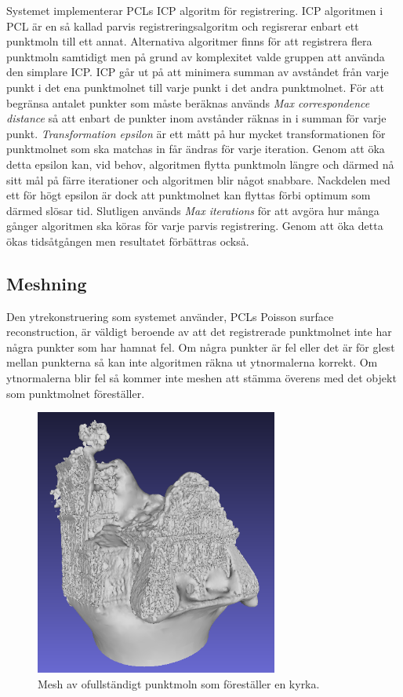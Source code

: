 Systemet implementerar PCLs ICP algoritm för registrering. ICP algoritmen i PCL är en så kallad parvis registreringsalgoritm och regisrerar enbart ett punktmoln till ett annat. Alternativa algoritmer finns för att registrera flera punktmoln samtidigt men på grund av komplexitet valde gruppen att använda den simplare ICP. ICP går ut på att minimera summan av avståndet från varje punkt i det ena punktmolnet till varje punkt i det andra punktmolnet. För att begränsa antalet punkter som måste beräknas används \textit{Max correspondence distance} så att enbart de punkter inom avstånder räknas in i summan för varje punkt. \textit{Transformation epsilon} är ett mått på hur mycket transformationen för punktmolnet som ska matchas in får ändras för varje iteration. Genom att öka detta epsilon kan, vid behov, algoritmen flytta punktmoln längre och därmed nå sitt mål på färre iterationer och algoritmen blir något snabbare. Nackdelen med ett för högt epsilon är dock att punktmolnet kan flyttas förbi optimum som därmed slösar tid. Slutligen används \textit{Max iterations} för att avgöra hur många gånger algoritmen ska köras för varje parvis registrering. Genom att öka detta ökas tidsåtgången men resultatet förbättras också.

\subsection{Meshning}

Den ytrekonstruering som systemet använder, PCLs Poisson surface reconstruction, är väldigt beroende av att det registrerade punktmolnet inte har några punkter som har hamnat fel. Om några punkter är fel eller det är för glest mellan punkterna så kan inte algoritmen räkna ut ytnormalerna korrekt. Om ytnormalerna blir fel så kommer inte meshen att stämma överens med det objekt som punktmolnet föreställer.

\begin{figure}[H]
	\centering
	\includegraphics[width=80mm]{figures/3DCopyMeshChurch.PNG}
	\caption{Mesh av ofullständigt punktmoln som föreställer en kyrka.}
	\label{fig:3dcopy_mesh_church}
\end{figure}

